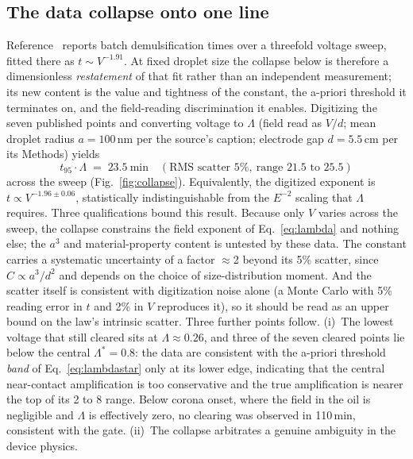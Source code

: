 \documentclass[aps,prfluids,reprint,amsmath,amssymb,superscriptaddress,longbibliography]{revtex4-2}
\begin{document}
\subsection{The data collapse onto one line}

Reference~\cite{panat2025} reports batch demulsification times over a
threefold voltage sweep, fitted there as $t\!\sim\!V^{-1.91}$. At fixed
droplet size the collapse below is therefore a dimensionless
\emph{restatement} of that fit rather than an independent measurement; its
new content is the value and tightness of the constant, the a-priori
threshold it terminates on, and the field-reading discrimination it
enables. Digitizing the seven published points and converting voltage to $\Lambda$
(field read as $V/d$; mean droplet radius $a=100$\,nm per the source's
caption; electrode gap $d=5.5$\,cm per its Methods) yields
\begin{equation}
t_{95}\cdot\Lambda \;=\; 23.5\ \text{min}
\quad(\text{RMS scatter } 5\%,\ \text{range } 21.5\text{ to }25.5)
\label{eq:collapse}
\end{equation}
across the sweep (Fig.~\ref{fig:collapse}). Equivalently, the digitized
exponent is $t\propto V^{-1.96\pm0.06}$, statistically indistinguishable
from the $E^{-2}$ scaling that $\Lambda$ requires. Three qualifications
bound this result. Because only $V$ varies across the sweep, the collapse
constrains the field exponent of Eq.~\ref{eq:lambda} and nothing else; the
$a^{3}$ and material-property content is untested by these data. The
constant carries a systematic uncertainty of a factor $\approx$2 beyond
its 5\% scatter, since $C\propto a^{3}/d^{2}$ and depends on the choice
of size-distribution moment. And the scatter itself is consistent with
digitization noise alone (a Monte Carlo with 5\% reading error in $t$ and
2\% in $V$ reproduces it), so it should be read as an upper bound on the
law's intrinsic scatter. Three further points
follow. (i)~The lowest voltage that still cleared sits at $\Lambda\approx0.26$,
and three of the seven cleared points lie below the central
$\Lambda^{*}=0.8$: the data are consistent with the a-priori threshold
\emph{band} of Eq.~\ref{eq:lambdastar} only at its lower edge, indicating
that the central near-contact amplification is too conservative and the
true amplification is nearer the top of its 2 to 8 range. Below corona onset,
where the field in the oil is negligible and $\Lambda$ is effectively
zero, no clearing was observed in 110\,min, consistent with the gate. (ii)~The collapse arbitrates a genuine ambiguity in the device physics.
\end{document}
